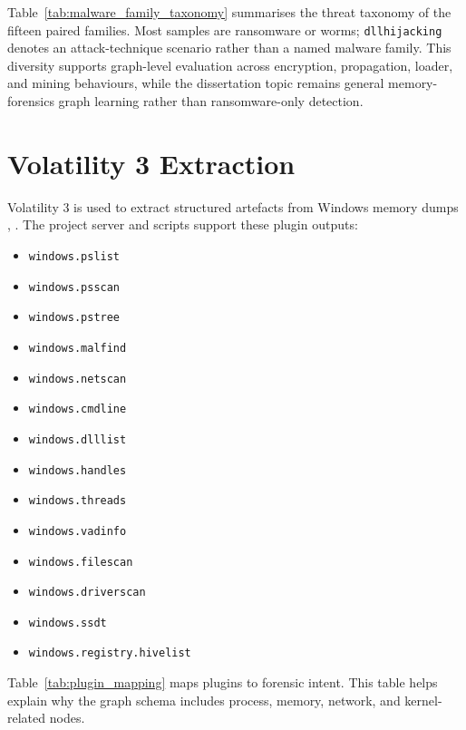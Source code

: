 Table~\ref{tab:malware_family_taxonomy} summarises the threat taxonomy of the fifteen paired families. Most samples are ransomware or worms; \texttt{dllhijacking} denotes an attack-technique scenario rather than a named malware family. This diversity supports graph-level evaluation across encryption, propagation, loader, and mining behaviours, while the dissertation topic remains general memory-forensics graph learning rather than ransomware-only detection.



\section{Volatility 3 Extraction}

Volatility 3 is used to extract structured artefacts from Windows memory dumps \cite{volatility3docs}, \cite{volatility3github}. The project server and scripts support these plugin outputs:

\begin{itemize}
\item \texttt{windows.pslist}
\item \texttt{windows.psscan}
\item \texttt{windows.pstree}
\item \texttt{windows.malfind}
\item \texttt{windows.netscan}
\item \texttt{windows.cmdline}
\item \texttt{windows.dlllist}
\item \texttt{windows.handles}
\item \texttt{windows.threads}
\item \texttt{windows.vadinfo}
\item \texttt{windows.filescan}
\item \texttt{windows.driverscan}
\item \texttt{windows.ssdt}
\item \texttt{windows.registry.hivelist}
\end{itemize}

Table~\ref{tab:plugin_mapping} maps plugins to forensic intent. This table helps explain why the graph schema includes process, memory, network, and kernel-related nodes.

